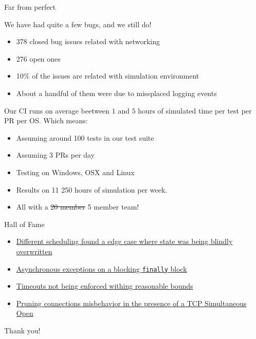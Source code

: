 \documentclass{beamer}
\begin{document}
\begin{frame}{Far from perfect}

  We have had quite a few bugs, and we still do!

  \begin{itemize}
    \item \alert{378 closed bug issues} related with networking
    \item \alert{276 open ones}
    \item \alert{10\%} of the issues are related with simulation environment
    \item About a handful of them were due to missplaced logging events
  \end{itemize}

  Our CI runs on average beetween $1$ and $5$ hours of simulated time per test per
  PR per OS. Which means:

  \begin{itemize}
    \item Assuming around 100 tests in our test suite
    \item Assuming 3 PRs per day
    \item Testing on Windows, OSX and Linux
    \item Results on 11 250 hours of simulation per week. \pause
    \item All with a \st{20 member} \alert{5 member team}!
  \end{itemize}

\end{frame}

\begin{frame}{Hall of Fame}

  \begin{itemize}
    \item
      \href{https://github.com/input-output-hk/ouroboros-network/pull/3640/commits/f21334b7630c939a1ef35e452d10956cbf39e3fd}{Different
      scheduling found a edge case where state was being blindly overwritten}
    \vskip0.4cm
    \item
      \href{https://github.com/input-output-hk/ouroboros-network/issues/3572}{Asynchronous
      exceptions on a blocking \texttt{finally} block}
    \vskip0.4cm
    \item
      \href{https://github.com/input-output-hk/ouroboros-network/issues/3553}{Timeouts not
      being enforced withing reasonable bounds}
    \vskip0.4cm
    \item
      \href{https://github.com/input-output-hk/ouroboros-network/issues/3344}{Pruning
      connections misbehavior in the presence of a TCP Simultaneous Open}
  \end{itemize}

\end{frame}

\begin{frame}
  \centering
  Thank you!
\end{frame}
\end{document}
